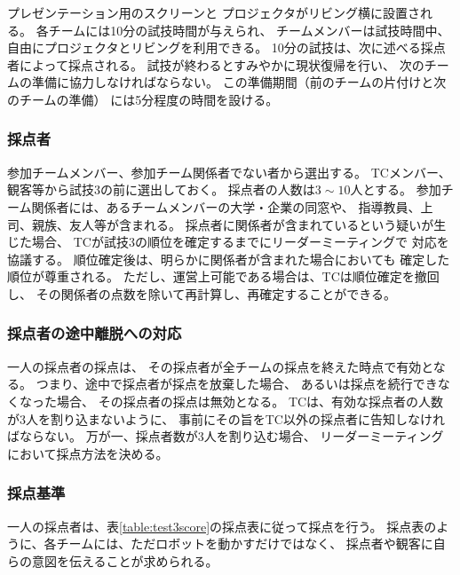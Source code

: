 \documentclass[a4j]{jarticle}
\begin{document}
プレゼンテーション用のスクリーンと
プロジェクタがリビング横に設置される。
各チームには10分の試技時間が与えられ、
チームメンバーは試技時間中、
自由にプロジェクタとリビングを利用できる。
10分の試技は、次に述べる採点者によって採点される。
試技が終わるとすみやかに現状復帰を行い、
次のチームの準備に協力しなければならない。
この準備期間（前のチームの片付けと次のチームの準備）
には5分程度の時間を設ける。

\subsubsection{採点者}

参加チームメンバー、参加チーム関係者でない者から選出する。
TCメンバー、観客等から試技3の前に選出しておく。
採点者の人数は$3\sim10$人とする。
参加チーム関係者には、あるチームメンバーの大学・企業の同窓や、
指導教員、上司、親族、友人等が含まれる。
採点者に関係者が含まれているという疑いが生じた場合、
TCが試技3の順位を確定するまでにリーダーミーティングで
対応を協議する。
順位確定後は、明らかに関係者が含まれた場合においても
確定した順位が尊重される。
ただし、運営上可能である場合は、TCは順位確定を撤回し、
その関係者の点数を除いて再計算し、再確定することができる。

\subsubsection{採点者の途中離脱への対応}

一人の採点者の採点は、
その採点者が全チームの採点を終えた時点で有効となる。
つまり、途中で採点者が採点を放棄した場合、
あるいは採点を続行できなくなった場合、
その採点者の採点は無効となる。
TCは、有効な採点者の人数が$3$人を割り込まないように、
事前にその旨をTC以外の採点者に告知しなければならない。
万が一、採点者数が$3$人を割り込む場合、
リーダーミーティングにおいて採点方法を決める。

\subsubsection{採点基準}

一人の採点者は、表\ref{table:test3score}の採点表に従って採点を行う。
採点表のように、各チームには、ただロボットを動かすだけではなく、
採点者や観客に自らの意図を伝えることが求められる。
\end{document}
